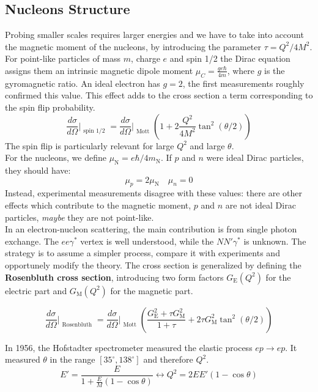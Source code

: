 \documentclass[10.75pt,a4paper,openright,bottom=2cm]{article}
\begin{document}
\subsection{Nucleons Structure}
Probing smaller scales requires larger energies and we have to take into account the magnetic moment of the nucleons, by introducing the parameter $\tau=Q^2/4M^2$. For point-like particles of mass $m$, charge $e$ and spin 1/2 the Dirac equation assigns them an intrinsic magnetic dipole moment $\mu_C=\frac{ge\hbar}{4m}$, where $g$ is the gyromagnetic ratio. An ideal electron has $g=2$, the first measurements roughly confirmed this value. This effect adds to the cross section a term corresponding to the spin flip probability.
\[
\frac{d\sigma}{d\Omega}\Bigr|_{\substack{\text{spin 1/2}}}=\frac{d\sigma}{d\Omega}\Bigr|_{\substack{\text{Mott}}}\left(1+2\frac{Q^2}{4M^2}\tan^2(\theta/2)\right)
\]
The spin flip is particularly relevant for large $Q^2$ and large $\theta$.\\
For the nucleons, we define $\mu_{\text{N}}=e\hbar/4m_{\text{N}}$. If $p$ and $n$ were ideal Dirac particles, they should have:
\[
\mu_p=2\mu_{\text{N}} \quad \mu_n=0
\]
Instead, experimental measurements disagree with these values: there are other effects which contribute to the magnetic moment, $p$ and $n$ are not ideal Dirac particles, \textit{maybe} they are not point-like.\\
In an electron-nucleon scattering, the main contribution is from single photon exchange. The $ee\gamma^*$ vertex is well understood, while the $NN'\gamma^*$ is unknown. The strategy is to assume a simpler process, compare it with experiments and opportunely modify the theory. The cross section is generalized by defining the \textbf{Rosenbluth cross section}, introducing two form factors $G_{\text{E}}(Q^2)$ for the electric part and $G_{\text{M}}(Q^2)$ for the magnetic part.
\begin{tcolorbox}[width=\textwidth,colback={yellow!50},title={Rosenbluth Cross Section},colbacktitle={gray!50},coltitle=black]
\[
\frac{d\sigma}{d\Omega}\Bigr|_{\substack{\text{Rosenbluth}}}=\frac{d\sigma}{d\Omega}\Bigr|_{\substack{\text{Mott}}}\left(\frac{G_{\text{E}}^2+\tau G_{\text{M}}^2}{1+\tau}+2\tau G_{\text{M}}^2\tan^2(\theta/2)\right)
\]
\end{tcolorbox}
\noindent
In 1956, the Hofstadter spectrometer measured the elastic process $ep\to ep$. It measured $\theta$ in the range $[35^\circ,138^\circ]$ and therefore $Q^2$.
\[
E'=\frac{E}{1+\frac{E}{M}(1-\cos\theta)}\leftrightarrow Q^2=2EE'(1-\cos\theta)
\]
\end{document}
